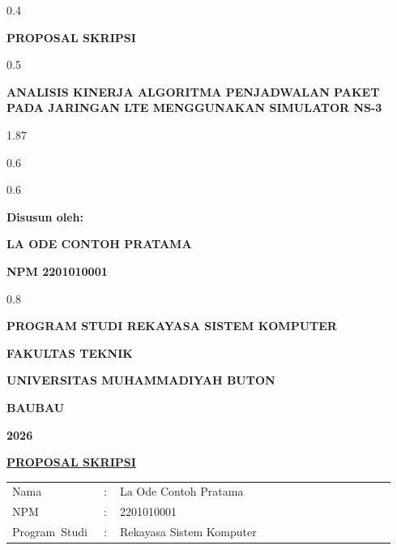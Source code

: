 \thispagestyle{empty}
\begin{ruang}{0.4}\end{ruang}
\begin{sampulbesar}
\textbf{PROPOSAL SKRIPSI}
\end{sampulbesar}
\begin{ruang}{0.5}\end{ruang}
\begin{sampulbesar}
\textbf{ANALISIS KINERJA ALGORITMA PENJADWALAN PAKET PADA JARINGAN LTE MENGGUNAKAN SIMULATOR NS-3}
\end{sampulbesar}
\begin{ruang}{1.87}\end{ruang}
\begin{ruang}{0.6}\end{ruang}
\begin{tengah}
\logo{4.5cm}
\end{tengah}
\begin{ruang}{0.6}\end{ruang}
\begin{sampulsedang}
\textbf{Disusun oleh:}

\textbf{LA ODE CONTOH PRATAMA}

\textbf{NPM 2201010001}
\end{sampulsedang}
\begin{ruang}{0.8}\end{ruang}
\begin{sampulsedang}
\textbf{PROGRAM STUDI REKAYASA SISTEM KOMPUTER}

\textbf{FAKULTAS TEKNIK}

\textbf{UNIVERSITAS MUHAMMADIYAH BUTON}

\textbf{BAUBAU}

\textbf{2026}
\end{sampulsedang}
\begin{halamanbaru}\end{halamanbaru}

\thispagestyle{empty}
\begin{tengah}
\textbf{\underline{PROPOSAL SKRIPSI}}
\end{tengah}

\begin{tanpagaris}
\begin{longtable}{@{}p{0.22\linewidth}p{0.04\linewidth}p{0.68\linewidth}@{}}
Nama & : & La Ode Contoh Pratama \\[6pt]
NPM & : & 2201010001 \\[6pt]
\mbox{Program Studi} & : & Rekayasa Sistem Komputer \\
\end{longtable}
\end{tanpagaris}

